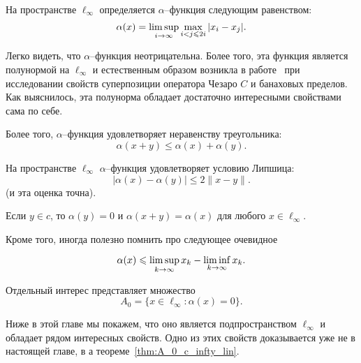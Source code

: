 На пространстве $\ell_\infty$ определяется $\alpha$--функция следующим равенством:
\begin{equation}
	\alpha(x) = \varlimsup_{i\to\infty} \max_{i<j\leqslant 2i} |x_i - x_j|
	.
\end{equation}

Легко видеть, что $\alpha$--функция неотрицательна.
Более того, эта функция является полунормой на $\ell_\infty$
и естественным образом возникла в работе~\cite[\S 2]{semenov2020invariant_noncommutative}
при исследовании свойств суперпозиции оператора Чезаро $C$ и банаховых пределов.
Как выяснилось, эта полунорма обладает достаточно интересными свойствами сама по себе.


\begin{property}
	\label{thm:alpha_x_triangle_ineq}
	Более того, $\alpha$--функция удовлетворяет неравенству треугольника:
	\begin{equation}
		\alpha(x+y) \leq \alpha(x) + \alpha(y)
		.
	\end{equation}
\end{property}

\begin{property}
	На пространстве $\ell_\infty$ $\alpha$--функция удовлетворяет условию Липшица:
	\begin{equation}\label{alpha_Lipshitz}
		|\alpha(x) - \alpha(y)| \leq 2 \|x-y\|
		.
	\end{equation}
	(и эта оценка точна).
\end{property}

\begin{property}
	Если $y\in c$, то $\alpha(y) = 0$ и $\alpha(x+y) = \alpha(x)$ для любого $x \in \ell_\infty$.
\end{property}

Кроме того, иногда полезно помнить про следующее очевидное
\begin{property}
	\label{thm:alpha_x_leq_limsup_minus_liminf}
	\begin{equation}
		\alpha(x) \leq \varlimsup_{k\to\infty} x_k - \varliminf_{k\to\infty} x_k
		.
	\end{equation}
\end{property}

Отдельный интерес представляет множество
\begin{equation}
	A_0 = \{x\in\ell_\infty : \alpha(x) = 0\}
	.
\end{equation}

Ниже в этой главе мы покажем, что оно является подпространством $\ell_\infty$ и обладает рядом интересных свойств.
Одно из этих свойств доказывается уже не в настоящей главе, в а теореме~\ref{thm:A_0_c_infty_lin}.
